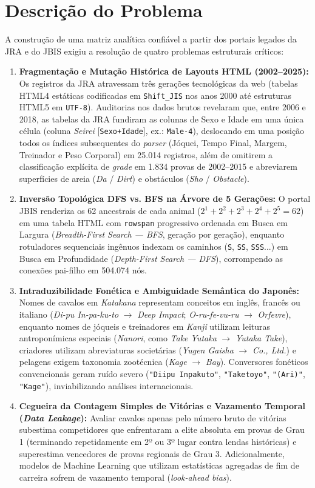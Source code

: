 \documentclass[conference]{IEEEtran}
\begin{document}
\section{Descrição do Problema}
A construção de uma matriz analítica confiável a partir dos portais legados da JRA e do JBIS exigiu a resolução de quatro problemas estruturais críticos:
\begin{enumerate}
    \item \textbf{Fragmentação e Mutação Histórica de Layouts HTML (2002--2025):} Os registros da JRA atravessam três gerações tecnológicas da web (tabelas HTML4 estáticas codificadas em \texttt{Shift\_JIS} nos anos 2000 até estruturas HTML5 em \texttt{UTF-8}). Auditorias nos dados brutos revelaram que, entre 2006 e 2018, as tabelas da JRA fundiram as colunas de Sexo e Idade em uma única célula (coluna \textit{Seirei} [\texttt{Sexo+Idade}], ex.: \texttt{Male-4}), deslocando em uma posição todos os índices subsequentes do \textit{parser} (Jóquei, Tempo Final, Margem, Treinador e Peso Corporal) em 25.014 registros, além de omitirem a classificação explícita de \textit{grade} em 1.834 provas de 2002--2015 e abreviarem superfícies de areia (\textit{Da} / \textit{Dirt}) e obstáculos (\textit{Sho} / \textit{Obstacle}).
    \item \textbf{Inversão Topológica DFS vs. BFS na Árvore de 5 Gerações:} O portal JBIS renderiza os 62 ancestrais de cada animal ($2^1 + 2^2 + 2^3 + 2^4 + 2^5 = 62$) em uma tabela HTML com \texttt{rowspan} progressivo ordenada em Busca em Largura (\textit{Breadth-First Search --- BFS}, geração por geração), enquanto rotuladores sequenciais ingênuos indexam os caminhos (\texttt{S}, \texttt{SS}, \texttt{SSS}...) em Busca em Profundidade (\textit{Depth-First Search --- DFS}), corrompendo as conexões pai-filho em 504.074 nós.
    \item \textbf{Intraduzibilidade Fonética e Ambiguidade Semântica do Japonês:} Nomes de cavalos em \textit{Katakana} representam conceitos em inglês, francês ou italiano (\textit{Di-pu In-pa-ku-to} $\to$ \textit{Deep Impact}; \textit{O-ru-fe-vu-ru} $\to$ \textit{Orfevre}), enquanto nomes de jóqueis e treinadores em \textit{Kanji} utilizam leituras antroponímicas especiais (\textit{Nanori}, como \textit{Take Yutaka} $\to$ \textit{Yutaka Take}), criadores utilizam abreviaturas societárias (\textit{Yugen Gaisha} $\to$ \textit{Co., Ltd.}) e pelagens exigem taxonomia zootécnica (\textit{Kage} $\to$ \textit{Bay}). Conversores fonéticos convencionais geram ruído severo (\texttt{"Diipu Inpakuto"}, \texttt{"Taketoyo"}, \texttt{"(Ari)"}, \texttt{"Kage"}), inviabilizando análises internacionais.
    \item \textbf{Cegueira da Contagem Simples de Vitórias e Vazamento Temporal (\textit{Data Leakage}):} Avaliar cavalos apenas pelo número bruto de vitórias subestima competidores que enfrentaram a elite absoluta em provas de Grau 1 (terminando repetidamente em 2º ou 3º lugar contra lendas históricas) e superestima vencedores de provas regionais de Grau 3. Adicionalmente, modelos de Machine Learning que utilizam estatísticas agregadas de fim de carreira sofrem de vazamento temporal (\textit{look-ahead bias}).
\end{enumerate}
\end{document}
